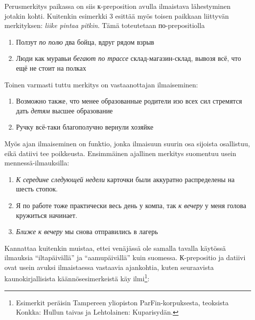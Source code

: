 \documentclass[]{scrartcl}
\providecommand{\tightlist}{%
  \setlength{\itemsep}{0pt}\setlength{\parskip}{0pt}}
\begin{document}
Perusmerkitys paikassa on siis к-preposition avulla ilmaistava
lähestyminen jotakin kohti. Kuitenkin esimerkki 3 esittää myös toisen
paikkaan liittyvän merkityksen: \emph{liike pintaa pitkin}. Tämä
toteutetaan по-prepositiolla

\begin{enumerate}
\def\labelenumi{(\arabic{enumi})}
\setcounter{enumi}{3}
\tightlist
\item
  Ползут \emph{по полю} два бойца, вдруг рядом взрыв
\item
  Люди как муравьи \emph{бегают по трассе} склад-магазин-склад, вывозя
  всё, что ещё не стоит на полках
\end{enumerate}

Toinen varmasti tuttu merkitys on vastaanottajan ilmaiseminen:

\begin{enumerate}
\def\labelenumi{(\arabic{enumi})}
\setcounter{enumi}{5}
\tightlist
\item
  Возможно также, что менее образованные родители изо всех сил стремятся
  дать \emph{детям} высшее образование
\item
  Ручку всё-таки благополучно вернули хозяйке
\end{enumerate}

Myös ajan ilmaiseminen on funktio, jonka ilmaisuun suurin osa sijoista
osallistuu, eikä datiivi tee poikkeusta. Ensimmäinen ajallinen merkitys
suomentuu usein mennessä-ilmauksilla:

\begin{enumerate}
\def\labelenumi{(\arabic{enumi})}
\setcounter{enumi}{7}
\tightlist
\item
  \emph{К середине следующей недели} карточки были аккуратно
  распределены на шесть стопок.
\item
  Я по работе тоже практически весь день у компа, так \emph{к вечеру} у
  меня голова кружиться начинает.
\item
  \emph{Ближе к вечеру} мы снова отправились в лагерь
\end{enumerate}

Kannattaa kuitenkin muistaa, ettei venäjässä ole samalla tavalla
käytössä ilmauksia ``iltapäivällä'' ja ``aamupäivällä'' kuin suomessa.
К-prepositio ja datiivi ovat usein avuksi ilmaistaessa vastaavia
ajankohtia, kuten seuraavista kaunokirjallisista käännösesimerkeistä käy
ilmi\footnote{Esimerkit peräisin Tampereen yliopiston
  ParFin-korpuksesta, teoksista Konkka: Hullun taivas ja Lehtolainen:
  Kuparisydän.}:
\end{document}
